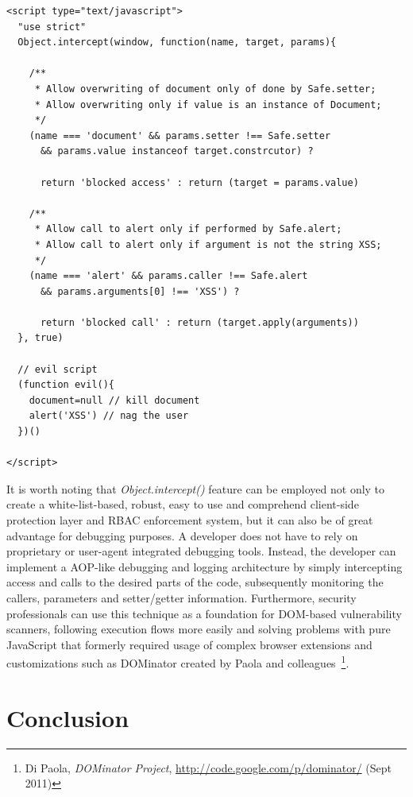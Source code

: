 \begin{lstlisting}[captionpos=b,label=lst:object-intercept-xmp,caption=Example code for real-life Object.intercept() usage; the attacker supplied code in the bottom area will be kept from executing successfully]
<script type="text/javascript">
  "use strict"
  Object.intercept(window, function(name, target, params){
    
    /**
     * Allow overwriting of document only of done by Safe.setter;
     * Allow overwriting only if value is an instance of Document;
     */
    (name === 'document' && params.setter !== Safe.setter 
      && params.value instanceof target.constrcutor) ?
      
      return 'blocked access' : return (target = params.value)

    /**
     * Allow call to alert only if performed by Safe.alert;
     * Allow call to alert only if argument is not the string XSS;
     */
    (name === 'alert' && params.caller !== Safe.alert 
      && params.arguments[0] !== 'XSS') ?
      
      return 'blocked call' : return (target.apply(arguments))
  }, true)

  // evil script
  (function evil(){
    document=null // kill document
    alert('XSS') // nag the user
  })()
  
</script>
\end{lstlisting}    

    It is worth noting that \textit{Object.intercept()} feature can be employed not only to create a white-list-based, robust, easy to use and comprehend client-side protection layer and RBAC enforcement system, but it can also be of great advantage for debugging purposes. A developer does not have to rely on proprietary or user-agent integrated debugging tools. Instead, the developer can implement a AOP-like debugging and logging architecture by simply intercepting access and calls to the desired parts of the code, subsequently monitoring the callers, parameters and setter/getter information. Furthermore, security professionals can use this technique as a foundation for DOM-based vulnerability scanners, following execution flows more easily and solving problems with pure JavaScript that formerly required usage of complex browser extensions and customizations such as DOMinator created by Paola and colleagues~\footnote{Di Paola, \textit{DOMinator Project}, \url{http://code.google.com/p/dominator/} (Sept 2011)}.\\
    
  \section{Conclusion}
  \label{subsec:6.8.conclusion}


